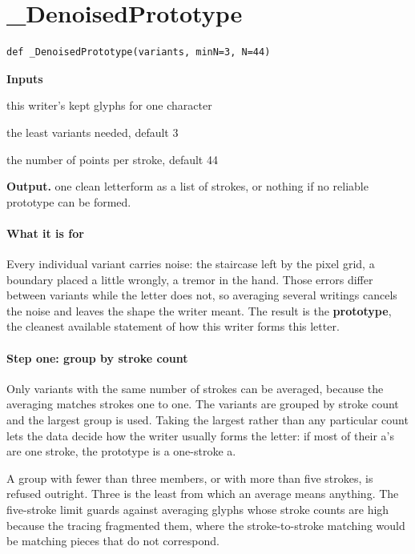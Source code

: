 \section{\_DenoisedPrototype}
\begin{lstlisting}[style=sig]
def _DenoisedPrototype(variants, minN=3, N=44)
\end{lstlisting}

\noindent\textbf{Inputs}
\begin{description}[leftmargin=2.2em,style=nextline,font=\normalfont\ttfamily]\setlength\itemsep{1pt}
  \item[{variants}] \normalfont this writer's kept glyphs for one character
  \item[{minN}] \normalfont the least variants needed, default 3
  \item[{N}] \normalfont the number of points per stroke, default 44
\end{description}

\noindent\textbf{Output.} one clean letterform as a list of strokes, or nothing if no reliable prototype can be formed.


\paragraph{What it is for}
Every individual variant carries noise: the staircase left by the pixel grid, a boundary placed a little wrongly, a tremor in the hand. Those errors differ between variants while the letter does not, so averaging several writings cancels the noise and leaves the shape the writer meant. The result is the \textbf{prototype}, the cleanest available statement of how this writer forms this letter.


\paragraph{Step one: group by stroke count}
Only variants with the same number of strokes can be averaged, because the averaging matches strokes one to one. The variants are grouped by stroke count and the largest group is used. Taking the largest rather than any particular count lets the data decide how the writer usually forms the letter: if most of their a's are one stroke, the prototype is a one-stroke a.

A group with fewer than three members, or with more than five strokes, is refused outright. Three is the least from which an average means anything. The five-stroke limit guards against averaging glyphs whose stroke counts are high because the tracing fragmented them, where the stroke-to-stroke matching would be matching pieces that do not correspond.


